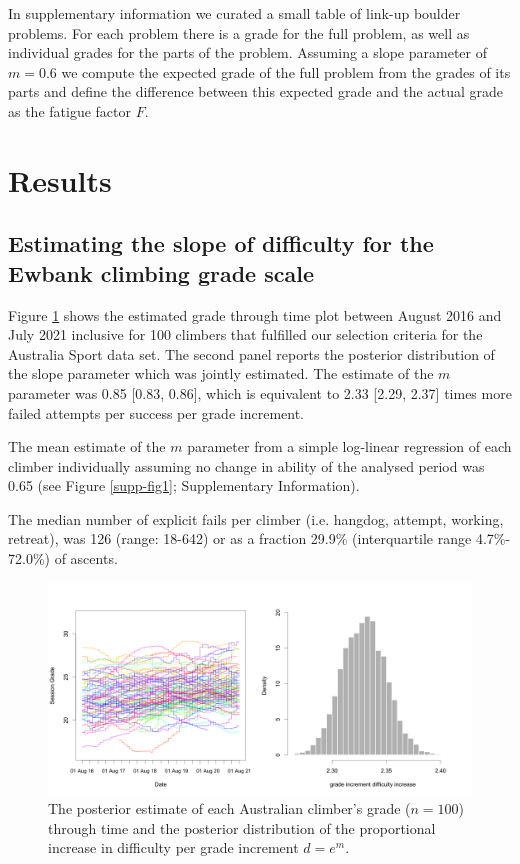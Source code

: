 \documentclass{article}
\begin{document}
In supplementary information we curated a small table of link-up boulder problems. For each problem there is a grade for the full problem, as well as individual grades for the parts of the problem. Assuming a slope parameter of $m=0.6$ we compute the expected grade of the full problem from the grades of its parts and define the difference between this expected grade and the actual grade as the fatigue factor $F$.

\section*{Results}

\subsection*{Estimating the slope of difficulty for the Ewbank climbing grade scale}


Figure \ref{aus_ascents} shows the estimated grade through time plot between August 2016 and July 2021 inclusive for 100 climbers that fulfilled our selection criteria for the Australia Sport data set. The second panel reports the posterior distribution of the slope parameter which was jointly estimated.
The estimate of the $m$ parameter was 0.85 [0.83, 0.86], which is equivalent to 2.33 [2.29, 2.37] times more failed attempts per success per grade increment. 

The mean estimate of the $m$ parameter from a simple log-linear regression of each climber individually assuming no change in ability of the analysed period was 0.65 (see Figure \ref{supp-fig1}; Supplementary Information). 

The median number of explicit fails per climber (i.e. \gls{hangdog}, attempt, working, retreat), was 126 (range: 18-642) or as a fraction 29.9\% (interquartile range 4.7\%- 72.0\%) of ascents.
\begin{figure}
\centering
\includegraphics[width=\textwidth]{../results/aus/ascents-from-2016-08-01-to-2021-08-01-minAscents30-minFails1-Sport-AU-session-posterior.png}
\caption{\small The posterior estimate of each Australian climber's grade ($n=100$) through time and the posterior distribution of the proportional increase in difficulty per grade increment $d = e^m$.}
\label{aus_ascents}
\end{figure}
\end{document}
